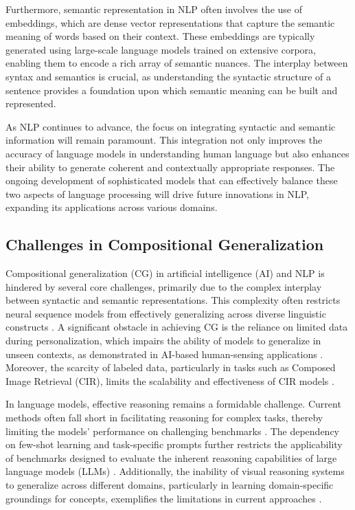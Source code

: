 Furthermore, semantic representation in NLP often involves the use of embeddings, which are dense vector representations that capture the semantic meaning of words based on their context. These embeddings are typically generated using large-scale language models trained on extensive corpora, enabling them to encode a rich array of semantic nuances. The interplay between syntax and semantics is crucial, as understanding the syntactic structure of a sentence provides a foundation upon which semantic meaning can be built and represented.



As NLP continues to advance, the focus on integrating syntactic and semantic information will remain paramount. This integration not only improves the accuracy of language models in understanding human language but also enhances their ability to generate coherent and contextually appropriate responses. The ongoing development of sophisticated models that can effectively balance these two aspects of language processing will drive future innovations in NLP, expanding its applications across various domains.



\subsection{Challenges in Compositional Generalization} \label{subsec:Challenges in Compositional Generalization}



Compositional generalization (CG) in artificial intelligence (AI) and NLP is hindered by several core challenges, primarily due to the complex interplay between syntactic and semantic representations. This complexity often restricts neural sequence models from effectively generalizing across diverse linguistic constructs \cite{zheng2023layerwiserepresentationfusioncompositional}. A significant obstacle in achieving CG is the reliance on limited data during personalization, which impairs the ability of models to generalize in unseen contexts, as demonstrated in AI-based human-sensing applications \cite{kaur2024cropcontextwiserobuststatic}. Moreover, the scarcity of labeled data, particularly in tasks such as Composed Image Retrieval (CIR), limits the scalability and effectiveness of CIR models \cite{jang2024visualdeltageneratorlarge}.



In language models, effective reasoning remains a formidable challenge. Current methods often fall short in facilitating reasoning for complex tasks, thereby limiting the models' performance on challenging benchmarks \cite{wei2022chain}. The dependency on few-shot learning and task-specific prompts further restricts the applicability of benchmarks designed to evaluate the inherent reasoning capabilities of large language models (LLMs) \cite{kojima2022large}. Additionally, the inability of visual reasoning systems to generalize across different domains, particularly in learning domain-specific groundings for concepts, exemplifies the limitations in current approaches \cite{hsu2023whatsleftconceptgrounding}.



